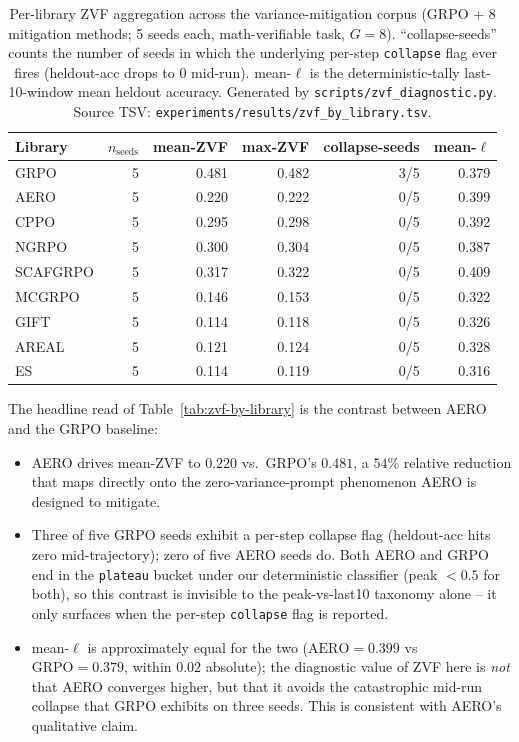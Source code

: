 \begin{table}[ht]
\centering
\small
\begin{tabular}{lrrrrr}
\toprule
Library & $n_{\text{seeds}}$ & mean-ZVF & max-ZVF & collapse-seeds & mean-$\ell$ \\
\midrule
GRPO      & 5 & 0.481 & 0.482 & 3/5 & 0.379 \\
AERO      & 5 & 0.220 & 0.222 & 0/5 & 0.399 \\
CPPO      & 5 & 0.295 & 0.298 & 0/5 & 0.392 \\
NGRPO     & 5 & 0.300 & 0.304 & 0/5 & 0.387 \\
SCAFGRPO  & 5 & 0.317 & 0.322 & 0/5 & 0.409 \\
MCGRPO    & 5 & 0.146 & 0.153 & 0/5 & 0.322 \\
GIFT      & 5 & 0.114 & 0.118 & 0/5 & 0.326 \\
AREAL     & 5 & 0.121 & 0.124 & 0/5 & 0.328 \\
ES        & 5 & 0.114 & 0.119 & 0/5 & 0.316 \\
\bottomrule
\end{tabular}
\caption{Per-library ZVF aggregation across the variance-mitigation
corpus (GRPO + 8 mitigation methods; 5 seeds each, math-verifiable
task, $G{=}8$). ``collapse-seeds'' counts the number of seeds in
which the underlying per-step \texttt{collapse} flag ever fires
(heldout-acc drops to 0 mid-run). mean-$\ell$ is the
deterministic-tally last-10-window mean heldout accuracy. Generated
by \texttt{scripts/zvf\_diagnostic.py}. Source TSV:
\texttt{experiments/results/zvf\_by\_library.tsv}.}
\label{tab:zvf-by-library-diagnostic}
\end{table}

The headline read of Table~\ref{tab:zvf-by-library} is the
contrast between AERO and the GRPO baseline:

\begin{itemize}
\item AERO drives mean-ZVF to $0.220$ vs.\ GRPO's $0.481$, a
      $54\%$ relative reduction that maps directly onto the
      zero-variance-prompt phenomenon AERO is designed to mitigate.
\item Three of five GRPO seeds exhibit a per-step collapse flag
      (heldout-acc hits zero mid-trajectory); zero of five AERO
      seeds do. Both AERO and GRPO end in the \texttt{plateau}
      bucket under our deterministic classifier (peak $<0.5$ for
      both), so this contrast is invisible to the peak-vs-last10
      taxonomy alone -- it only surfaces when the per-step
      \texttt{collapse} flag is reported.
\item mean-$\ell$ is approximately equal for the two
      ($\text{AERO}=0.399$ vs $\text{GRPO}=0.379$, within $0.02$
      absolute); the diagnostic value of ZVF here is \emph{not}
      that AERO converges higher, but that it avoids the
      catastrophic mid-run collapse that GRPO exhibits on three
      seeds. This is consistent with AERO's qualitative claim.
\end{itemize}

